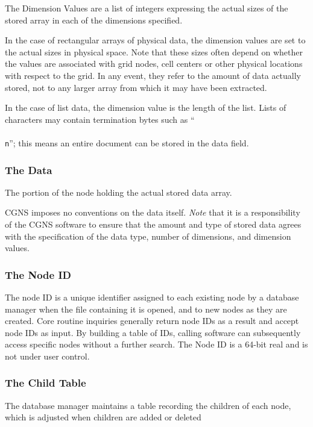 The Dimension Values are a list of integers expressing the actual sizes
of the stored array in each of the dimensions specified.

In the case of rectangular
arrays of physical data, the dimension values are set to the actual
sizes in physical space. Note that these sizes often depend on whether
the values are associated with grid nodes, cell centers or other
physical locations with respect to the grid. In any event, they refer to
the amount of data actually stored, not to any larger array from which
it may have been extracted.

In the case of list data, the dimension value is the length of the
list. Lists of characters may contain termination bytes such as
``\texttt{\\\\n}''; this means an entire document can be
stored in the data field.

\subsubsection{The Data}

The portion of the node holding the actual stored data array.

CGNS imposes no conventions on the data itself.
\textit{Note} that it is a responsibility of the CGNS software to ensure
that the amount and type of stored data agrees with the specification of
the data type, number of dimensions, and dimension values.

\subsubsection{The Node ID}

The node ID is a unique identifier assigned to each existing node by
a database manager when the file containing it is opened, and to new
nodes as they are created. Core routine inquiries generally return node
IDs as a result and accept node IDs as input. By building a table of IDs,
calling software can subsequently access specific nodes without a
further search. The Node ID is a 64-bit real and is not under user control.

\subsubsection{The Child Table}

The database manager maintains a table recording the
children of each node, which is adjusted when children are added or
deleted

